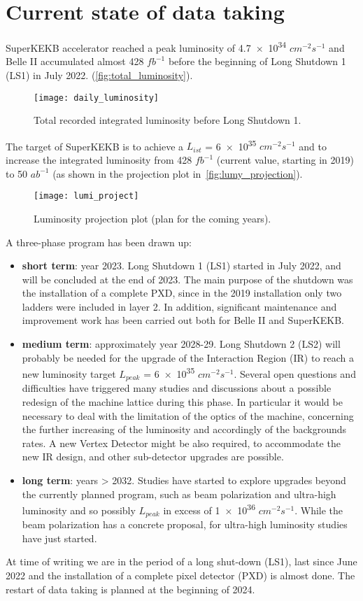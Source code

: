 \section{Current state of data taking} \label{sec:perspectives}

SuperKEKB accelerator reached a peak luminosity of \num{4.7e34} $cm^{-2}s^{-1}$ and Belle II accumulated almost 428 $fb^{-1}$ before the beginning of Long Shutdown 1 (LS1) in July 2022. (\autoref{fig:total_luminosity}).

\begin{figure}[h!]
\centering
\texttt{[image: daily\_luminosity]}
\caption{Total recorded integrated luminosity before Long Shutdown 1.}
\label{fig:total_luminosity}
\end{figure}

The target of SuperKEKB is to achieve a \textit{$L_{ist}$} = \num{6e35} $cm^{-2}s^{-1}$ and to increase the integrated luminosity from 428 $fb^{-1}$ (current value, starting in 2019) to 50 $ab^{-1}$ (as shown in the projection plot in~\autoref{fig:lumy_projection}).\\

\begin{figure}
\centering
\texttt{[image: lumi\_project]}
\caption{Luminosity projection plot (plan for the coming years).}
\label{fig:lumy_projection}
\end{figure}


A three-phase program has been drawn up:

\begin{itemize}
\item \textbf{short term}: year 2023. Long Shutdown 1 (LS1) started in July 2022, and will be concluded at the end of 2023. The main purpose of the shutdown was the installation of a complete PXD, since in the 2019 installation only two ladders were included in layer 2. In addition, significant maintenance and improvement work has been carried out both for Belle II and SuperKEKB.
\item \textbf{medium term}: approximately year 2028-29. Long Shutdown 2 (LS2) will probably be needed for the upgrade of the Interaction Region (IR) to reach a new luminosity target $\textit{L}_{peak}$ = \num{6e35} $cm^{-2}s^{-1}$. 
Several open questions and difficulties have triggered many studies and discussions about a possible redesign of the machine lattice during this phase. In particular it would be necessary to deal with the limitation of the optics of the machine, concerning the further increasing of the luminosity and accordingly of the backgrounds rates. A new Vertex Detector might be also required, to accommodate the new IR design, and other sub-detector upgrades are possible. 
\item \textbf{long term}: years > 2032. Studies have started to explore upgrades beyond the currently planned program, such as beam polarization and ultra-high luminosity and so possibly $\textit{L}_{peak}$ in excess of \num{1e36} $cm^{-2}s^{-1}$. While the beam polarization has a concrete proposal, for ultra-high luminosity studies have just started.
\end{itemize}

At time of writing we are in the period of a long shut-down (LS1), last since June 2022 and the installation of a complete pixel detector (PXD) is almost done. The restart of data taking is planned at the beginning of 2024.

